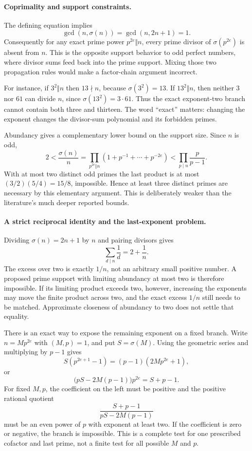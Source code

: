 \documentclass[11pt,a4paper]{article}
\begin{document}
\paragraph{Coprimality and support constraints.}
The defining equation implies
\[
             \gcd(n,\sigma(n))=\gcd(n,2n+1)=1.
\]
Consequently for any exact prime power $p^{2e}\Vert n$, every prime
divisor of $\sigma(p^{2e})$ is absent from $n$. This is the opposite
support behavior to odd perfect numbers, where divisor sums feed back
into the prime support. Mixing those two propagation rules would make
a factor-chain argument incorrect.

For instance, if $3^2\Vert n$ then $13\nmid n$, because
$\sigma(3^2)=13$. If $13^2\Vert n$, then neither $3$ nor $61$
can divide $n$, since $\sigma(13^2)=3\cdot61$. Thus the exact
exponent-two branch cannot contain both three and thirteen.
The word ``exact'' matters: changing the exponent changes the
divisor-sum polynomial and its forbidden primes.

Abundancy gives a complementary lower bound on the support size.
Since $n$ is odd,
\[
 2<\frac{\sigma(n)}n=\prod_{p^{2e}\Vert n}
       \left(1+p^{-1}+\cdots+p^{-2e}\right)
   <\prod_{p\mid n}\frac p{p-1}.
\]
With at most two distinct odd primes the last product is at most
$(3/2)(5/4)=15/8$, impossible. Hence at least three distinct primes
are necessary by this elementary argument. This is deliberately weaker
than the literature's much deeper reported bounds.

\paragraph{A strict reciprocal identity and the last-exponent problem.}
Dividing $\sigma(n)=2n+1$ by $n$ and pairing divisors gives
\[
                 \sum_{d\mid n}\frac1d=2+\frac1n.
\]
The excess over two is exactly $1/n$, not an arbitrary small positive
number. A proposed prime support with limiting abundancy at most two is
therefore impossible. If its limiting product exceeds two, however,
increasing the exponents may move the finite product across two, and
the exact excess $1/n$ still needs to be matched. Approximate closeness
of abundancy to two does not settle that equality.

There is an exact way to expose the remaining exponent on a fixed
branch. Write $n=Mp^{2e}$ with $(M,p)=1$, and put $S=\sigma(M)$.
Using the geometric series and multiplying by $p-1$ gives
\[
 S(p^{2e+1}-1)=(p-1)(2Mp^{2e}+1),
\]
or
\[
 \bigl(pS-2M(p-1)\bigr)p^{2e}=S+p-1.
\]
For fixed $M,p$, the coefficient on the left must be positive and
the positive rational quotient
\[
             \frac{S+p-1}{pS-2M(p-1)}
\]
must be an even power of $p$ with exponent at least two.
If the coefficient is zero or negative, the branch is impossible.
This is a complete test for one prescribed cofactor and last prime,
not a finite test for all possible $M$ and $p$.
\end{document}
